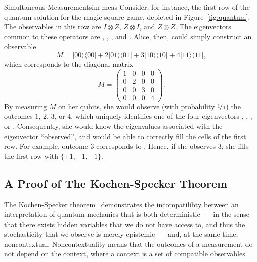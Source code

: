\documentclass{llncs}
\newcommand{\ketbra}[2]{\ensuremath{| #1 \rangle \langle #2 |}}
\begin{document}
\begin{tcbexample}{Simultaneous Measurement}{sim-meas}
  Consider, for instance, the first row of the quantum solution for
  the magic square game, depicted in Figure~\ref{fig:quantum}. The
  observables in this row are \(I \otimes Z\), \(Z \otimes I\), and
  \(Z \otimes Z\). The eigenvectors common to these operators are
  , , , and . Alice, then, could
  simply construct an observable
  \[M = \ketbra{00}{00} + 2 \ketbra{01}{01} + 3 \ketbra{10}{10} + 4
    \ketbra{11}{11},\] which corresponds to the diagonal matrix
  \begin{equation*}
    M = \begin{pmatrix}
          1 & 0 & 0 & 0 \\
          0 & 2 & 0 & 0 \\
          0 & 0 & 3 & 0 \\
          0 & 0 & 0 & 4
    \end{pmatrix}.
  \end{equation*}
  By measuring \(M\) on her qubits, she would observe (with
  probability \(\nicefrac{1}{4}\)) the outcomes \(1\), \(2\), \(3\), or
  \(4\), which uniquely identifies one of the four eigenvectors
  , , , or . Consequently, she would
  know the eigenvalues associated with the eigenvector ``observed'',
  and would be able to correctly fill the cells of the first row. For
  example, outcome \(3\) corresponds to . Hence, if she
  observes \(3\), she fills the first row with \(\{+1, -1, -1\}\).
\end{tcbexample}

\subsection{A Proof of The Kochen-Specker Theorem}
\label{sec:context}

The Kochen-Specker theorem~\cite{kochen:1967} demonstrates
the incompatilibty between an interpretation of quantum mechanics
that is both deterministic ---~in the sense that there exists
hidden variables that we do not have access to, and thus
the stochasticity that we observe is merely epistemic~--- and,
at the same time, noncontextual. Noncontextuality means that
the outcomes of a measurement do not depend on the context,
where a context is a set of compatible observables.
\end{document}

